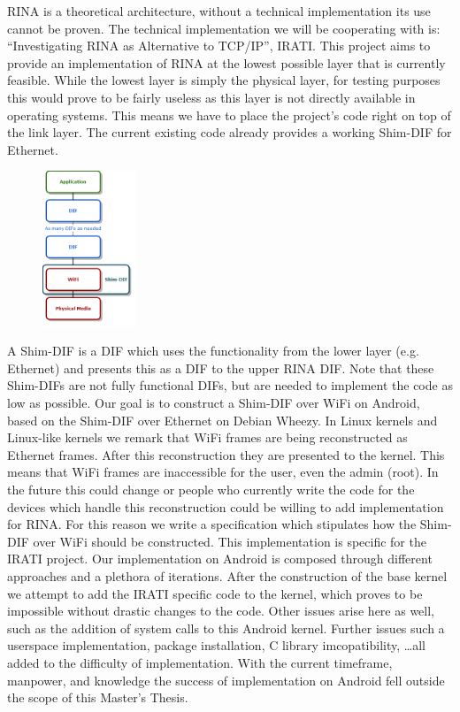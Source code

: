 \begin{slshape}
RINA is a theoretical architecture, without a technical implementation its use cannot be proven. The technical implementation we will be cooperating with is: ``Investigating RINA as Alternative to TCP/IP'', IRATI. This project aims to provide an implementation of RINA at the lowest possible layer that is currently feasible. While the lowest layer is simply the physical layer, for testing purposes this would prove to be fairly useless as this layer is not directly available in operating systems. This means we have to place the project's code right on top of the link layer. The current existing code already provides a working Shim-DIF for Ethernet. 
\begin{figure}
	\centering
	\includegraphics[width=0.25\textwidth]{figures/rinaoverwifi}
\end{figure}
A Shim-DIF is a DIF which uses the functionality from the lower layer (e.g. Ethernet) and presents this as a DIF to the upper RINA DIF. Note that these Shim-DIFs are not fully functional DIFs, but are needed to implement the code as low as possible. Our goal is to construct a Shim-DIF over WiFi on Android, based on the Shim-DIF over Ethernet on Debian Wheezy. 
\npar
In Linux kernels and Linux-like kernels we remark that WiFi frames are being reconstructed as Ethernet frames. After this reconstruction they are presented to the kernel. This means that WiFi frames are inaccessible for the user, even the admin (root). In the future this could change or people who currently write the code for the devices which handle this reconstruction could be willing to add implementation for RINA. For this reason we write a specification which stipulates how the Shim-DIF over WiFi should be constructed. This implementation is specific for the IRATI project.
\npar
Our implementation on Android is composed through different approaches and a plethora of iterations. After the construction of the base kernel we attempt to add the IRATI specific code to the kernel, which proves to be impossible without drastic changes to the code. Other issues arise here as well, such as the addition of system calls to this Android kernel. Further issues such a userspace implementation, package installation, C library imcopatibility, \ldots all added to the difficulty of implementation. With the current timeframe, manpower, and knowledge the success of implementation on Android fell outside the scope of this Master's Thesis. 




\end{slshape}
